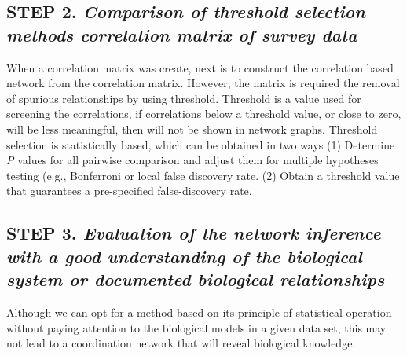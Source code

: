 \subsection*{\textbf{STEP 2. }\textit{Comparison of threshold selection methods correlation matrix of survey data}} 

When a correlation matrix was create, next is to construct the correlation based network from the correlation matrix. However, the matrix is required the removal of spurious relationships by using threshold. Threshold is a value used for screening the correlations, if correlations  below a threshold value, or close to zero, will be less meaningful, then will not be shown in network graphs. Threshold selection is statistically based, which can be obtained in two ways (1) Determine \textit{P} values for all pairwise comparison and adjust them for multiple hypotheses testing (e.g., Bonferroni or local false discovery rate. (2) Obtain a threshold value that guarantees a pre-specified false-discovery rate.


\subsection*{\textbf{STEP 3. }\textit{Evaluation of the network inference with a good understanding of the biological system or documented biological relationships}} 

Although we can opt for a method based on its principle of statistical operation without paying attention to the biological models in a given data set, this may not lead to a coordination network that will reveal biological knowledge. 



